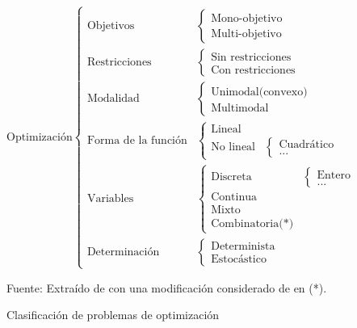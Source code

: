 \begin{figure}
\centering
\begin{displaymath}
    \text{Optimización}
    \begin{cases}
        \text{Objetivos}& 
            \begin{cases}
                \text{Mono-objetivo}\\
                \text{Multi-objetivo}
            \end{cases}
        \\
        \text{Restricciones}& 
            \begin{cases}
                \text{Sin restricciones}\\
                \text{Con restricciones}
            \end{cases}
        \\
        \text{Modalidad}& 
            \begin{cases}
                \text{Unimodal(convexo)}\\
                \text{Multimodal}
            \end{cases}
        \\
        \text{Forma de la función}& 
            \begin{cases}
                \text{Lineal}\\
                \text{No lineal}& 
                    \begin{cases}
                        \text{Cuadrático}\\
                        \text{...}
                    \end{cases}
            \end{cases}
        \\
        \text{Variables}& 
            \begin{cases}
                \text{Discreta}& 
                    \begin{cases}
                        \text{Entero}\\
                        \text{...}
                    \end{cases}
                \\
                \text{Continua}\\
                \text{Mixto}\\
                \text{Combinatoria(*)}
            \end{cases}
        \\
        \text{Determinación}& 
            \begin{cases}
                \text{Determinista}\\
                \text{Estocástico}
            \end{cases}
    \end{cases}
\end{displaymath}
\label{fig:clasificaionoptimizacion}
\caption{Clasificación de problemas de optimización}
Fuente: Extraído de  con una modificación considerado de  en (*).
\end{figure}

